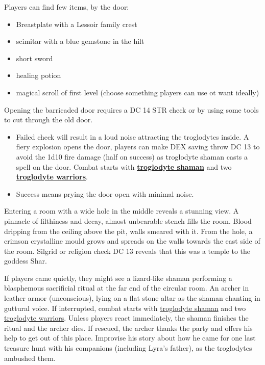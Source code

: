 \documentclass[10pt,onecolumn,twoside,openany,bg=full,layout=true]{dndbook}
\begin{document}
Players can find few items, by the door:
\begin{itemize}
  \item Breastplate with a Lessoir family crest
  \item scimitar with a blue gemstone in the hilt
  \item short sword
  \item healing potion
  \item magical scroll of first level (choose something players can use ot want ideally)
\end{itemize}
Opening the barricaded door requires a DC 14 STR check or by using some tools to cut through the old door.
\begin{itemize}
  \item Failed check will result in a loud noise attracting the troglodytes inside.
A fiery explosion opens the door, players can make DEX saving throw DC 13 to avoid the 1d10 fire damage (half on success)
  as troglodyte shaman casts a spell on the door.
  Combat starts with \textbf{\href{https://www.dndbeyond.com/monsters/17278-kobold-scale-sorcerer}{troglodyte shaman}}
  and two \textbf{\href{https://www.dndbeyond.com/monsters/17204-troglodyte}{troglodyte warriors}}.
  \item Success means prying the door open with minimal noise.
  \end{itemize}
\label{subsec:main-teple-room}
Entering a room with a wide hole in the middle reveals a stunning view.
A pinnacle of filthiness and decay, almost unbearable stench fills the room.
Blood dripping from the ceiling above the pit, walls smeared with it.
From the hole, a crimson crystalline mould grows and spreads on the walls towards the east side of the room.
Silgrid or religion check DC 13 reveals that this was a temple to the goddess Shar.

If players came quietly, they might see a lizard-like shaman performing a blasphemous
sacrificial ritual at the far end of the circular room.
An archer in leather armor (unconscious), lying on a flat stone altar as the shaman chanting in guttural voice.
If interrupted, combat starts with \href{https://www.dndbeyond.com/monsters/17278-kobold-scale-sorcerer}{troglodyte shaman}
and two \href{https://www.dndbeyond.com/monsters/17204-troglodyte}{troglodyte warriors}.
Unless players react immediately, the shaman finishes the ritual and the archer dies.
If rescued, the archer thanks the party and offers his help to get out of this place.
Improvise his story about how he came for one last treasure hunt with his companions (including Lyra's father),
as the troglodytes ambushed them.
\end{document}
